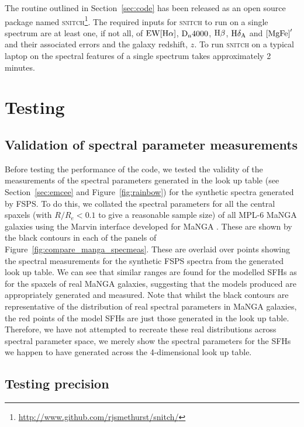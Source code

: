 \documentclass[useAMS,usenatbib]{mn2e}
\begin{document}
The routine outlined in Section~\ref{sec:code} has been released as an open source package named \textsc{snitch}\footnote{\url{http://www.github.com/rjsmethurst/snitch/}}. The required inputs for \textsc{snitch} to run on a single spectrum are at least one, if not all, of $\rm{EW}[H\alpha]$, $\rm{D}_n4000$, $\rm{H}\beta$, $\rm{H}\delta_A$ and $\rm{[MgFe]}^{\prime}$ and their associated errors and the galaxy redshift, $z$. To run \textsc{snitch} on a typical laptop on the spectral features of a single spectrum takes approximately 2 minutes. 

\section{Testing}\label{sec:test}

\subsection{Validation of spectral parameter measurements}\label{sec:precisiontest}


Before testing the performance of the code, we tested the validity of the measurements of the spectral parameters generated in the look up table (see Section~\ref{sec:emcee} and Figure~\ref{fig:rainbow}) for the synthetic spectra generated by FSPS. To do this, we collated the spectral parameters for all the central spaxels (with $R/R_e < 0.1$ to give a reasonable sample size) of all MPL-6 MaNGA galaxies using the Marvin interface developed for MaNGA \citep{cherinka18}. These are shown by the black contours in each of the panels of Figure~\ref{fig:compare_manga_specmeas}. These are overlaid over points showing the spectral measurements for the synthetic FSPS spectra from the generated look up table. We can see that similar ranges are found for the modelled SFHs as for the spaxels of real MaNGA galaxies, suggesting that the models produced are appropriately generated and measured. Note that whilst the black contours are representative of the distribution of real spectral parameters in MaNGA galaxies, the red points of the model SFHs are just those generated in the look up table. Therefore, we have not attempted to recreate these real distributions across spectral parameter space, we merely show the spectral parameters for the SFHs we happen to have generated across the 4-dimensional look up table. 




\subsection{Testing precision}\label{sec:precisiontest}
\end{document}
